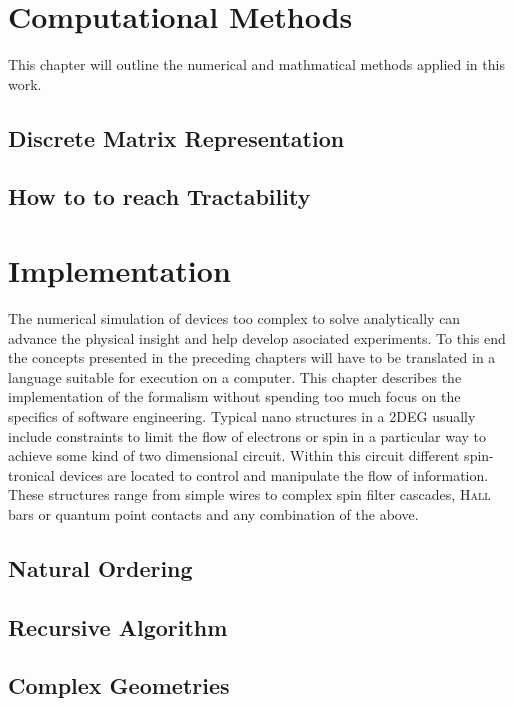 \chapter{Computational Methods}
This chapter will outline the numerical and mathmatical methods applied in this work.
  \section{Discrete Matrix Representation}\label{sec:discretematrixrep}
  
  \section{How to to reach Tractability}
  
\chapter{Implementation}
The numerical simulation of devices too complex to solve analytically can advance the physical insight and help develop asociated experiments. To this end the concepts presented in the preceding chapters will have to be translated in a language suitable for execution on a computer. This chapter describes the implementation of the \gfnc{} formalism without spending too much focus on the specifics of software engineering.
Typical nano structures in a 2DEG usually include constraints to limit the flow of electrons or spin in a particular way to achieve some kind of two dimensional circuit. Within this circuit different spin-tronical devices are located to control and manipulate the flow of information. These structures range from simple wires to complex spin filter cascades, \textsc{Hall} bars or quantum point contacts and any combination of the above.
\section{Natural Ordering}

\section{Recursive \cgfnc{} Algorithm}

\section{Complex Geometries}
\label{sec:recursivegreenfncalgorithm}

